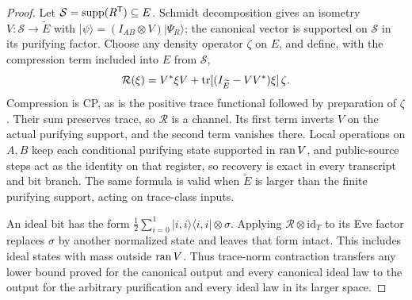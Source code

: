\begin{proof}
Let $\mathcal S=\operatorname{supp}(R^\mathsf T)\subseteq E$.  Schmidt decomposition gives
an isometry $V:\mathcal S\to\widetilde E$ with
$|\psi\rangle=(I_{AB}\otimes V)|\Psi_R\rangle$; the canonical vector
is supported on $\mathcal S$ in its purifying factor.  Choose any
density operator $\zeta$ on $E$, and define, with the compression term
included into $E$ from $\mathcal S$,
\[
 \mathcal R(\xi)=V^*\xi V+
       \operatorname{tr}[(I_{\widetilde E}-VV^*)\xi]\,\zeta.
\]
Compression is CP, as is the positive trace functional followed by
preparation of $\zeta$.  Their sum preserves trace, so $\mathcal R$ is
a channel.  Its first term inverts $V$ on the actual purifying support,
and the second term vanishes there.  Local operations on $A,B$ keep
each conditional purifying state supported in $\operatorname{ran} V$, and public-source
steps act as the identity on that register, so recovery is
exact in every transcript and bit branch.  The same formula is valid when $\widetilde E$ is
larger than the finite purifying support, acting on trace-class inputs.

An ideal bit has the form
$\frac12\sum_{i=0}^1|i,i\rangle\langle i,i|\otimes\sigma$.
Applying $\mathcal R\otimes\mathrm{id}_T$ to its Eve factor replaces
$\sigma$ by another normalized state and leaves that form intact.
This includes ideal states with mass outside $\operatorname{ran} V$.  Thus
trace-norm contraction transfers any lower bound proved for the
canonical output and every canonical ideal law to the output for the
arbitrary purification and every ideal law in its larger space.
\end{proof}
